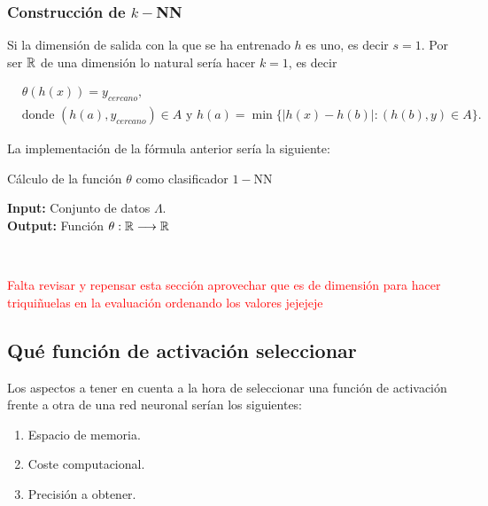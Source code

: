 \subsubsection*{Construcción de $k-$NN}  

Si la dimensión de salida con la que se ha entrenado $h$ es uno, es decir $s=1$. Por ser $\mathbb{R}$ de una dimensión lo natural sería hacer $k=1$, es decir 

\begin{align}
    & \theta(h(x)) = y_{cercano}, \\
    &\text{donde } 
    (h(a),  y_{cercano}) \in A 
    \text{ y }
    h(a) = \min \{|h(x) - h(b)| :  (h(b),  y) \in A  \}.
\end{align}

La implementación de la fórmula anterior sería la siguiente: 

\begin{algorithm}[H]
   \caption{ Cálculo de la función $\theta$ como clasificador $1-$NN} 
   \textbf{Input: } Conjunto de datos $\Lambda$.  \\
   \textbf{Output: } Función $\theta : \mathbb{R} \longrightarrow \mathbb{R}$
   \begin{algorithmic}[1]
    \STATE {} \\
    \Return{$\theta$}
   \end{algorithmic}
\end{algorithm}

\textcolor{red}{Falta revisar y repensar esta sección 
aprovechar que es de dimensión para hacer triquiñuelas en la evaluación ordenando los valores jejejeje}

\subsection{Qué función de activación seleccionar}

Los aspectos a tener en cuenta a la hora de seleccionar una función 
de activación frente a otra de una red neuronal serían los siguientes:
\begin{enumerate}
    \item Espacio de memoria.
    \item Coste computacional.
    \item Precisión a obtener.
\end{enumerate}

